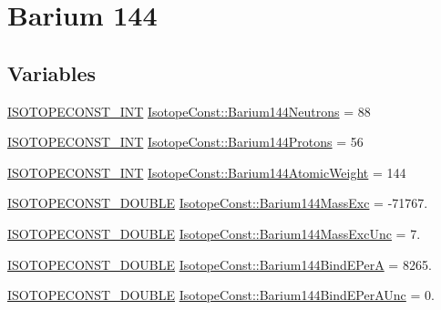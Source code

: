 \hypertarget{group___isotope_const-_barium-_ba144}{}\section{Barium 144}
\label{group___isotope_const-_barium-_ba144}
\subsection*{Variables}
\begin{DoxyCompactItemize}
\item 
\mbox{\hyperlink{group___isotope_const-_macros_ga5f18360b3e99483a35c32d789e62621c}{I\+S\+O\+T\+O\+P\+E\+C\+O\+N\+S\+T\+\_\+\+I\+NT}} \mbox{\hyperlink{group___isotope_const-_barium-_ba144_gafdf84912249ea6f9a51774cf7cc43d70}{Isotope\+Const\+::\+Barium144\+Neutrons}} = 88
\item 
\mbox{\hyperlink{group___isotope_const-_macros_ga5f18360b3e99483a35c32d789e62621c}{I\+S\+O\+T\+O\+P\+E\+C\+O\+N\+S\+T\+\_\+\+I\+NT}} \mbox{\hyperlink{group___isotope_const-_barium-_ba144_gaa8c8e814f22af569d0ec8a369822093f}{Isotope\+Const\+::\+Barium144\+Protons}} = 56
\item 
\mbox{\hyperlink{group___isotope_const-_macros_ga5f18360b3e99483a35c32d789e62621c}{I\+S\+O\+T\+O\+P\+E\+C\+O\+N\+S\+T\+\_\+\+I\+NT}} \mbox{\hyperlink{group___isotope_const-_barium-_ba144_ga4a595ef46c09b9f3fe3b41f85c3c7d67}{Isotope\+Const\+::\+Barium144\+Atomic\+Weight}} = 144
\item 
\mbox{\hyperlink{group___isotope_const-_macros_ga8f45a7272ce02c0b4c65c44636ed719a}{I\+S\+O\+T\+O\+P\+E\+C\+O\+N\+S\+T\+\_\+\+D\+O\+U\+B\+LE}} \mbox{\hyperlink{group___isotope_const-_barium-_ba144_ga29edb62e5a83715ca1bac495ec85e873}{Isotope\+Const\+::\+Barium144\+Mass\+Exc}} = -\/71767.
\item 
\mbox{\hyperlink{group___isotope_const-_macros_ga8f45a7272ce02c0b4c65c44636ed719a}{I\+S\+O\+T\+O\+P\+E\+C\+O\+N\+S\+T\+\_\+\+D\+O\+U\+B\+LE}} \mbox{\hyperlink{group___isotope_const-_barium-_ba144_gab4acd21312fbd1d5c806fe66f5272896}{Isotope\+Const\+::\+Barium144\+Mass\+Exc\+Unc}} = 7.
\item 
\mbox{\hyperlink{group___isotope_const-_macros_ga8f45a7272ce02c0b4c65c44636ed719a}{I\+S\+O\+T\+O\+P\+E\+C\+O\+N\+S\+T\+\_\+\+D\+O\+U\+B\+LE}} \mbox{\hyperlink{group___isotope_const-_barium-_ba144_ga506dea7cb739ba07c66b3c5270764842}{Isotope\+Const\+::\+Barium144\+Bind\+E\+PerA}} = 8265.
\item 
\mbox{\hyperlink{group___isotope_const-_macros_ga8f45a7272ce02c0b4c65c44636ed719a}{I\+S\+O\+T\+O\+P\+E\+C\+O\+N\+S\+T\+\_\+\+D\+O\+U\+B\+LE}} \mbox{\hyperlink{group___isotope_const-_barium-_ba144_gab5b0af9553cbd5a1d3157dbc18aa47ff}{Isotope\+Const\+::\+Barium144\+Bind\+E\+Per\+A\+Unc}} = 0.

\end{DoxyCompactItemize}
